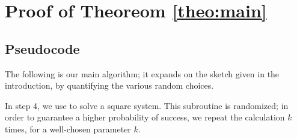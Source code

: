 \documentclass[a4paper]{article}
\begin{document}
\section{Proof of Theoreom \ref{theo:main}}



\subsection{Pseudocode}
%
The following is our main algorithm; it expands on the sketch given in
the introduction, by quantifying the various random choices.

In step 4, we use \cite[Algorithm 2]{SH} to solve a square
system. This subroutine is randomized; in order to guarantee a higher
probability of success, we repeat the calculation $k$ times, for a
well-chosen parameter $k$.
\end{document}
